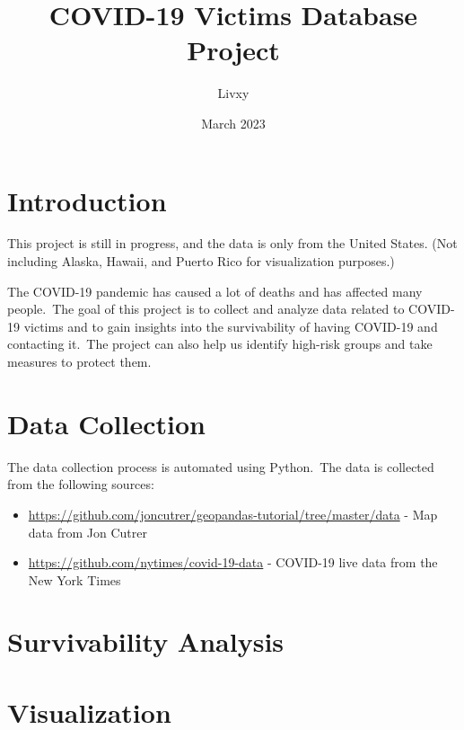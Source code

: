 \documentclass{article}
\begin{document}
\title{COVID-19 Victims Database Project}
\author{Livxy}
\date{March 2023}

\maketitle
\thispagestyle{empty}
\vspace{50cm}
\setlength{\columnsep}{14pt}


\section{Introduction}
\begin{boxH}
    This project is still in progress, and the data is only from the United States. (Not including Alaska, Hawaii, and Puerto Rico for visualization purposes.)
\end{boxH}

\indent

The COVID-19 pandemic has caused a lot of deaths and has affected many people.\
The goal of this project is to collect and analyze data related to COVID-19 victims and to gain insights into the survivability of having COVID-19 and contacting it.\
The project can also help us identify high-risk groups and take measures to protect them.


\section{Data Collection}
\indent

The data collection process is automated using Python.\
The data is collected from the following sources: \
\begin{itemize}
    \item \cite{cutrer} \url{https://github.com/joncutrer/geopandas-tutorial/tree/master/data} - Map data from Jon Cutrer
    \item \cite{nytimes} \url{https://github.com/nytimes/covid-19-data} - COVID-19 live data from the New York Times
\end{itemize}



\section{Survivability Analysis}


\section{Visualization}
\end{document}
